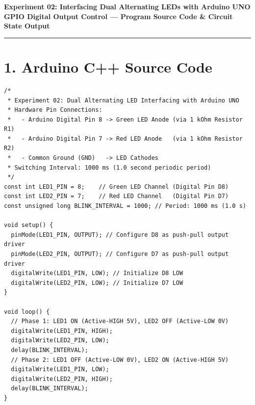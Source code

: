 \documentclass[11pt,a4paper]{article}
\begin{document}
\begin{center}
    {\Large\bfseries Experiment 02: Interfacing Dual Alternating LEDs with Arduino UNO}\\[0.10cm]
    {\normalsize\textbf{GPIO Digital Output Control --- Program Source Code \& Circuit State Output}}
\end{center}
\vspace{-0.20cm}
\rule{\textwidth}{0.9pt}
\vspace{0.06cm}

\section*{1. Arduino C++ Source Code}

\begin{lstlisting}[style=bwArduino, title={\textbf{Listing 2.1: Microcontroller Firmware for Periodic Anti-Phase LED Blinking.}}]
/*
 * Experiment 02: Dual Alternating LED Interfacing with Arduino UNO
 * Hardware Pin Connections:
 *   - Arduino Digital Pin 8 -> Green LED Anode (via 1 kOhm Resistor R1)
 *   - Arduino Digital Pin 7 -> Red LED Anode   (via 1 kOhm Resistor R2)
 *   - Common Ground (GND)   -> LED Cathodes
 * Switching Interval: 1000 ms (1.0 second periodic period)
 */
const int LED1_PIN = 8;    // Green LED Channel (Digital Pin D8)
const int LED2_PIN = 7;    // Red LED Channel   (Digital Pin D7)
const unsigned long BLINK_INTERVAL = 1000; // Period: 1000 ms (1.0 s)

void setup() {
  pinMode(LED1_PIN, OUTPUT); // Configure D8 as push-pull output driver
  pinMode(LED2_PIN, OUTPUT); // Configure D7 as push-pull output driver
  digitalWrite(LED1_PIN, LOW); // Initialize D8 LOW
  digitalWrite(LED2_PIN, LOW); // Initialize D7 LOW
}

void loop() {
  // Phase 1: LED1 ON (Active-HIGH 5V), LED2 OFF (Active-LOW 0V)
  digitalWrite(LED1_PIN, HIGH);
  digitalWrite(LED2_PIN, LOW);
  delay(BLINK_INTERVAL);
  // Phase 2: LED1 OFF (Active-LOW 0V), LED2 ON (Active-HIGH 5V)
  digitalWrite(LED1_PIN, LOW);
  digitalWrite(LED2_PIN, HIGH);
  delay(BLINK_INTERVAL);
}
\end{lstlisting}
\end{document}
